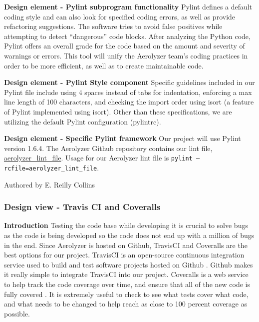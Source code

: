 \documentclass[onecolumn, draftclsnofoot,10pt, compsoc]{IEEEtran}
\begin{document}
\begin{flushleft}
\medskip

\textbf{Design element - Pylint subprogram functionality} Pylint defines a default coding style and can also look for specified coding errors, as well as provide refactoring suggestions. 
The software tries to avoid false positives while attempting to detect “dangerous” code blocks. 
After analyzing the Python code, Pylint offers an overall grade for the code based on the amount and severity of warnings or errors. 
This tool will unify the Aerolyzer team’s coding practices in order to be more efficient, as well as to create maintainable code. 

\medskip

\textbf{Design element - Pylint Style component} Specific guidelines included in our Pylint file include using 4 spaces instead of tabs for indentation, enforcing a max line length of 100 characters, and checking the import order using isort (a feature of Pylint implemented using isort). Other than these specifications, we are utilizing the default Pylint configuration (pylintrc).

\medskip

\textbf{Design element - Specific Pylint framework} Our project will use Pylint version 1.6.4. The Aerolyzer Github repository contains our lint file, {\href{https://github.com/Aerolyzer/Aerolyzer/blob/master/aerolyzer_lint_file}{aerolyzer\_lint\_file}}. Usage for our Aerolyzer lint file is \texttt{pylint --rcfile=aerolyzer\_lint\_file}.

\smallskip

\footnotesize Authored by E. Reilly Collins
\normalsize

\bigskip

\subsubsection{Design view - Travis CI and Coveralls}
\textbf{Introduction} Testing the code base while developing it is crucial to solve bugs as the code is being developed so the code does not end up with a million of bugs in the end.  Since Aerolyzer is hosted on Github, TravisCI and Coveralls are the best options for our project. TravisCI is an open-source continuous integration service used to build and test software projects hosted on Github \cite{15}.  Github makes it really simple to integrate TravisCI into our project. Coveralls is a  web service to help track the code coverage over time, and ensure that all of the new code is fully covered \cite{16}. It is extremely useful to check to see what tests cover what code, and what needs to be changed to help reach as close to 100 percent coverage as possible.


\end{flushleft}
\end{document}

